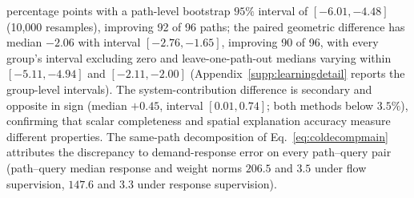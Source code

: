 percentage points with a path-level bootstrap $95\%$ interval of
$[-6.01,-4.48]$ (10,000 resamples), improving 92 of 96 paths; the
paired geometric difference has median $-2.06$ with interval
$[-2.76,-1.65]$, improving 90 of 96, with every group's interval
excluding zero and leave-one-path-out medians varying within
$[-5.11,-4.94]$ and $[-2.11,-2.00]$
(Appendix~\ref{supp:learningdetail} reports the group-level intervals).
The system-contribution difference is secondary and opposite in sign
(median $+0.45$, interval $[0.01,0.74]$; both methods below $3.5\%$),
confirming that scalar completeness and spatial explanation accuracy
measure different properties. The same-path decomposition of
Eq.~\eqref{eq:coldecompmain} attributes the discrepancy to demand-response
error on every path--query pair (path--query median response and weight
norms $206.5$ and $3.5$ under flow supervision, $147.6$ and $3.3$ under
response supervision).

